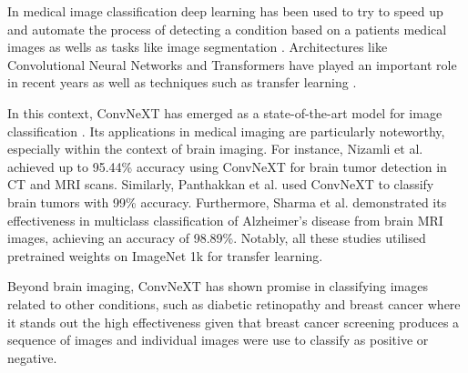In medical image classification deep learning has been used to try to speed up and automate the process of detecting a condition based on a patients medical images as wells as tasks like image segmentation \cite{dlmedicalimages}. Architectures like Convolutional Neural Networks and Transformers have played an important role in recent years as well as techniques such as transfer learning \cite{dlmedicalimages}.

In this context, ConvNeXT has emerged as a state-of-the-art model for image classification \cite{convnextbro}. Its applications in medical imaging are particularly noteworthy, especially within the context of brain imaging.  For instance, Nizamli et al. \cite{nizamli_accurate_2024} achieved up to 95.44\% accuracy using ConvNeXT for brain tumor detection in CT and MRI scans. Similarly, Panthakkan et al. \cite{panthakkan_unleashing_2023} used ConvNeXT to classify brain tumors with 99\% accuracy.  Furthermore, Sharma et al. \cite{sharma_neurospectra_2023}  demonstrated its effectiveness in multiclass classification of Alzheimer's disease from brain MRI images, achieving an accuracy of 98.89\%. Notably, all these studies utilised pretrained weights on ImageNet 1k for transfer learning. 

Beyond brain imaging, ConvNeXT has shown promise in classifying images related to other conditions, such as diabetic retinopathy \cite{devanshi_early_2023} and breast cancer \cite{reddy_enhancing_2024} where it stands out the high effectiveness given that breast cancer screening produces a sequence of images and individual images were use to classify as positive or negative.